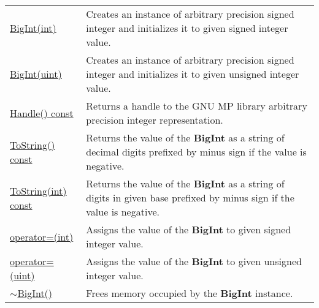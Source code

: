\documentclass[a4paper,oneside,11.000000pt]{book}
\begin{document}
\begin{flushleft}
\begin{supertabular}[l]{!{\raggedright}p{7.575cm}!{\raggedright}p{7.575cm}}
\\
\hyperlink{System.Numerics.Multiprecision.BigInt.constructor.P.System.Numerics.Multiprecision.BigInt.int}{BigInt(int)}
& Creates an instance of arbitrary precision signed integer and initializes it to given signed integer value.

\\
\hyperlink{System.Numerics.Multiprecision.BigInt.constructor.P.System.Numerics.Multiprecision.BigInt.uint}{BigInt(uint)}
& Creates an instance of arbitrary precision signed integer and initializes it to given unsigned integer value.

\\
\hyperlink{System.Numerics.Multiprecision.BigInt.Handle.C.P.System.Numerics.Multiprecision.BigInt}{Handle() const}
& Returns a handle to the GNU MP library arbitrary precision integer representation.

\\
\hyperlink{System.Numerics.Multiprecision.BigInt.ToString.C.P.System.Numerics.Multiprecision.BigInt}{ToString() const}
& Returns the value of the \textbf{BigInt}
 as a string of decimal digits prefixed by minus sign if the value is negative.

\\
\hyperlink{System.Numerics.Multiprecision.BigInt.ToString.C.P.System.Numerics.Multiprecision.BigInt.int}{ToString(int) const}
& Returns the value of the \textbf{BigInt}
 as a string of digits in given base prefixed by minus sign if the value is negative.

\\
\hyperlink{System.Numerics.Multiprecision.BigInt.operator.assign.P.System.Numerics.Multiprecision.BigInt.int}{operator=(int)}
& Assigns the value of the \textbf{BigInt}
 to given signed integer value.

\\
\hyperlink{System.Numerics.Multiprecision.BigInt.operator.assign.P.System.Numerics.Multiprecision.BigInt.uint}{operator=(uint)}
& Assigns the value of the \textbf{BigInt}
 to given unsigned integer value.

\\
\hyperlink{System.Numerics.Multiprecision.BigInt.destructor.P.System.Numerics.Multiprecision.BigInt}{$\sim$BigInt()}
& Frees memory occupied by the \textbf{BigInt}
 instance.

\\
\end{supertabular}

\end{flushleft}
\clearpage
\end{document}
